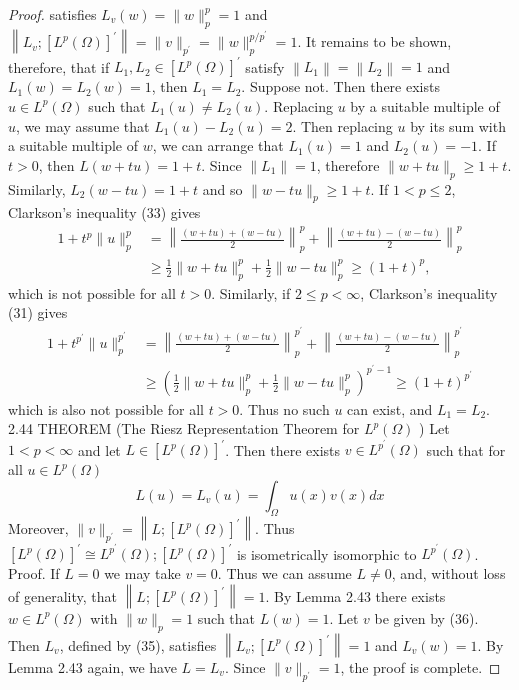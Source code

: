 \begin{proof}
  satisfies $L_v(w)=\|w\|_p^p=1$ and $\left\|L_v ;\left[L^p(\Omega)\right]^{\prime}\right\|=\|v\|_{p^{\prime}}=\|w\|_p^{p / p^{\prime}}=1$. It remains to be shown, therefore, that if $L_1, L_2 \in\left[L^p(\Omega)\right]^{\prime}$ satisfy $\left\|L_1\right\|=\left\|L_2\right\|=1$ and $L_1(w)=L_2(w)=1$, then $L_1=L_2$. Suppose not. Then there exists $u \in L^p(\Omega)$ such that $L_1(u) \neq L_2(u)$. Replacing $u$ by a suitable multiple of $u$, we may assume that $L_1(u)-L_2(u)=2$. Then replacing $u$ by its sum with a suitable multiple of $w$, we can arrange that $L_1(u)=1$ and $L_2(u)=-1$. If $t>0$, then $L(w+t u)=1+t$. Since $\left\|L_1\right\|=1$, therefore $\|w+t u\|_p \geq 1+t$. Similarly, $L_2(w-t u)=1+t$ and so $\|w-t u\|_p \geq 1+t$. If $1<p \leq 2$, Clarkson's inequality (33) gives
  \[
  \begin{aligned}
  1+t^p\|u\|_p^p & =\left\|\frac{(w+t u)+(w-t u)}{2}\right\|_p^p+\left\|\frac{(w+t u)-(w-t u)}{2}\right\|_p^p \\
  & \geq \frac{1}{2}\|w+t u\|_p^p+\frac{1}{2}\|w-t u\|_p^p \geq(1+t)^p,
  \end{aligned}
  \]
  which is not possible for all $t>0$. Similarly, if $2 \leq p<\infty$,
  Clarkson's inequality (31) gives
  \[
  \begin{aligned}
  1+t^{p^{\prime}}\|u\|_p^{p^{\prime}} & =\left\|\frac{(w+t u)+(w-t u)}{2}\right\|_p^{p^{\prime}}+\left\|\frac{(w+t u)-(w-t u)}{2}\right\|_p^{p^{\prime}} \\
  & \geq\left(\frac{1}{2}\|w+t u\|_p^p+\frac{1}{2}\|w-t u\|_p^p\right)^{p^{\prime}-1} \geq(1+t)^{p^{\prime}}
  \end{aligned}
  \]
  which is also not possible for all $t>0$. Thus no such $u$ can exist, and $L_1=L_2$.
  2.44 THEOREM (The Riesz Representation Theorem for $L^p(\Omega)$ ) Let $1<p<\infty$ and let $L \in\left[L^p(\Omega)\right]^{\prime}$. Then there exists $v \in L^{p^{\prime}}(\Omega)$ such that for all $u \in L^p(\Omega)$
  \[
  L(u)=L_v(u)=\int_{\Omega} u(x) v(x) d x
  \]
  Moreover, $\|v\|_{p^{\prime}}=\left\|L ;\left[L^p(\Omega)\right]^{\prime}\right\|$. Thus $\left[L^p(\Omega)\right]^{\prime} \cong L^{p^{\prime}}(\Omega) ;\left[L^p(\Omega)\right]^{\prime}$ is isometrically isomorphic to $L^{p^{\prime}}(\Omega)$.
  Proof. If $L=0$ we may take $v=0$. Thus we can assume $L \neq 0$, and, without loss of generality, that $\left\|L ;\left[L^p(\Omega)\right]^{\prime}\right\|=1$. By Lemma 2.43 there exists $w \in L^p(\Omega)$ with $\|w\|_p=1$ such that $L(w)=1$. Let $v$ be given by (36). Then $L_v$, defined by (35), satisfies $\left\|L_v ;\left[L^p(\Omega)\right]^{\prime}\right\|=1$ and $L_v(w)=1$. By Lemma 2.43 again, we have $L=L_v$. Since $\|v\|_{p^{\prime}}=1$, the proof is complete.
\end{proof}


